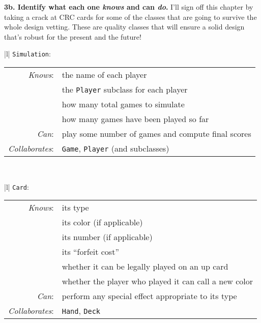 \vspace{.1in}
\textbf{3b. Identify what each one \textit{knows} and can \textit{do}.}
I'll sign off this chapter by taking a crack at CRC cards for some of the
classes that are going to survive the whole design vetting. These are quality
classes that will ensure a solid design that's robust for the present and the
future!

\small
\begin{center}
\begin{tabular}{|l|}
\hline
\texttt{Simulation}:\\
\hline
\begin{tabular}{rl}
\textit{Knows}: & the name of each player \\
& the \texttt{Player} subclass for each player \\
& how many total games to simulate \\
& how many games have been played so far \\
\textit{Can}: & play some number of games and compute final scores \\
\hline
\textit{Collaborates}: & \texttt{Game}, \texttt{Player} (and subclasses)\\
\end{tabular}\\
\hline
\end{tabular}
\end{center}

\begin{center}
\begin{tabular}{|l|}
\hline
\texttt{Card}:\\
\hline
\begin{tabular}{rl}
\textit{Knows}: & its type \\
& its color (if applicable) \\
& its number (if applicable) \\
& its ``forfeit cost'' \\
& whether it can be legally played on an up card \\
& whether the player who played it can call a new color \\
\textit{Can}: & perform any special effect appropriate to its type \\
\hline
\textit{Collaborates}: & \texttt{Hand}, \texttt{Deck} \\
\end{tabular}\\
\hline
\end{tabular}
\end{center}

